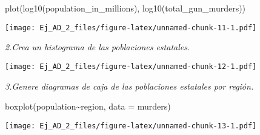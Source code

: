 \documentclass[
]{article}
\newenvironment{Shaded}{\begin{snugshade}}{\end{snugshade}}
\newcommand{\AttributeTok}[1]{\textcolor[rgb]{0.77,0.63,0.00}{#1}}
\newcommand{\FunctionTok}[1]{\textcolor[rgb]{0.00,0.00,0.00}{#1}}
\newcommand{\NormalTok}[1]{#1}
\newcommand{\SpecialCharTok}[1]{\textcolor[rgb]{0.00,0.00,0.00}{#1}}
\begin{document}
\begin{Shaded}
\begin{Highlighting}[]
\FunctionTok{plot}\NormalTok{(}\FunctionTok{log10}\NormalTok{(population\_in\_millions), }\FunctionTok{log10}\NormalTok{(total\_gun\_murders))}
\end{Highlighting}
\end{Shaded}

\texttt{[image: Ej\_AD\_2\_files/figure-latex/unnamed-chunk-11-1.pdf]}

\emph{2.Crea un histograma de las poblaciones estatales.}

\begin{Shaded}
\end{Shaded}

\texttt{[image: Ej\_AD\_2\_files/figure-latex/unnamed-chunk-12-1.pdf]}

\emph{3.Genere diagramas de caja de las poblaciones estatales por
región.}

\begin{Shaded}
\begin{Highlighting}[]
\FunctionTok{boxplot}\NormalTok{(population}\SpecialCharTok{\textasciitilde{}}\NormalTok{region, }\AttributeTok{data =}\NormalTok{ murders)}
\end{Highlighting}
\end{Shaded}

\texttt{[image: Ej\_AD\_2\_files/figure-latex/unnamed-chunk-13-1.pdf]}
\end{document}
